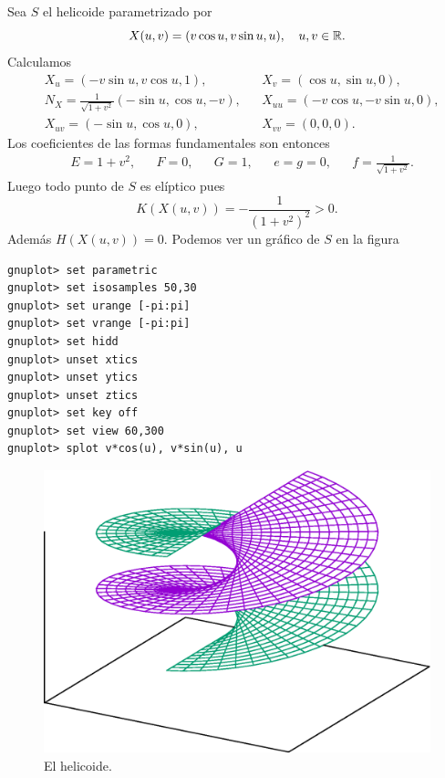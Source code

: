\begin{example}
	\label{exa:helicoide}
	Sea $S$ el helicoide parametrizado por
	\[
		X(u,v)=(v\cos u,v\sin u,u),\quad
		u,v\in\mathbb{R}.
	\]
	Calculamos
	\begin{align*}
		& X_u=(-v\sin u,v\cos u,1),
		&& X_v=(\cos u,\sin u,0),\\
		& N_X=\frac{1}{\sqrt{1+v^2}}(-\sin u,\cos u,-v),
		&&X_{uu}=(-v\cos u,-v\sin u,0),\\
		&X_{uv}=(-\sin u,\cos u,0),
		&&X_{vv}=(0,0,0).
	\end{align*}
	Los coeficientes de las formas fundamentales son entonces
	\begin{align*}
		&E=1+v^2, && F=0, && G=1,
		&&e=g=0, && f=\frac{1}{\sqrt{1+v^2}}.
	\end{align*}
	Luego todo punto de $S$ es elíptico pues 
	\[
		K(X(u,v))=-\frac{1}{(1+v^2)^2}>0.
	\]
	Además $H(X(u,v))=0$. Podemos ver un gráfico de $S$ en la figura
\begin{lstlisting}
gnuplot> set parametric
gnuplot> set isosamples 50,30
gnuplot> set urange [-pi:pi]
gnuplot> set vrange [-pi:pi]
gnuplot> set hidd
gnuplot> unset xtics
gnuplot> unset ytics
gnuplot> unset ztics
gnuplot> set key off
gnuplot> set view 60,300
gnuplot> splot v*cos(u), v*sin(u), u
\end{lstlisting}
\begin{figure}
		\centering
    	\includegraphics[scale=0.3]{eps/helicoide}
		\caption{El helicoide.}
		\label{fig:helicoide}
\end{figure}
\end{example}

